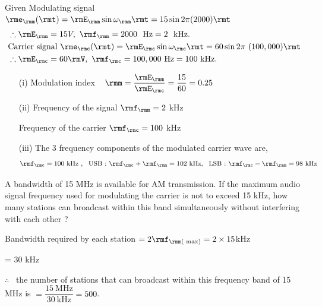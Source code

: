 \begin{solution}
Given Modulating signal $\rme_\rmm(\rmt) = \rmE_\rmm \sin \omega_\rmm \rmt = 15 \sin 2 \pi
(2000) \rmt$
\begin{align*}
& \therefore \rmE_\rmm = 15 V, ~\rmf_\rmm = 2000 ~\text{ Hz} = 2 ~\text{ kHz}.\\
& \text{Carrier signal } \rme_\rmc (\rmt) = \rmE_\rmc \sin \omega_\rmc \rmt = 60 \sin
2 \pi~(100,000)\rmt\\
& \therefore \rmE_\rmc = 60\rmV,  ~\rmf_\rmc = 100,000 \text{ Hz} =
100 \text{ kHz}.
\end{align*}
\begin{itemize}
\item[(i)] Modulation index ~ $\rmm = \dfrac{\rmE_\rmm}{\rmE_\rmc} = \dfrac{15}{60} =
0.25$

\item[(ii)] Frequency of the signal $\rmf_\rmm = 2$ kHz

Frequency of the carrier $\rmf_\rmc = 100$ kHz

\item[(iii)] The 3 frequency components of the modulated carrier wave
are, 
$$
\rmf_\rmc = 100 \text{ kHz }, ~~\text{USB : } \rmf_\rmc+\rmf_\rmm =
102 \text{ kHz}, ~~\text{LSB : } \rmf_\rmc - \rmf_\rmm = 98 \text{ kHz}
$$
\end{itemize}
\end{solution}

\begin{problem}\label{prob8.18}
A bandwidth of 15 MHz is available for AM transmission. If the maximum
audio signal frequency used for modulating the carrier is not to
exceed 15 kHz, how many stations can broadcast within this band
simultaneously without interfering with each other ?
\end{problem}

\begin{solution}
Bandwidth required by each station $= 2 \rmf_{\rmm(\text{ max})} = 2 \times
15 $kHz

\hspace{8.3cm} = 30 kHz

$\therefore$~ the number of stations that can broadcast within this
frequency band of 15 MHz \break is $=\dfrac{15~\text{MHz}}{30 ~\text{kHz}} = 500$.
\end{solution}

